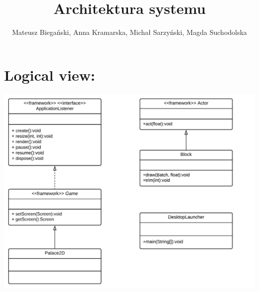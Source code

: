 \documentclass{article}
\begin{document}
\title{Architektura systemu}

\author{Mateusz Biegański, Anna Kramarska, Michał Sarzyński, Magda Suchodolska}
\maketitle

\section{Logical view:}

\begin{center}
    \includegraphics[scale=0.2]{palace2d.png}
\end{center}
\end{document}

